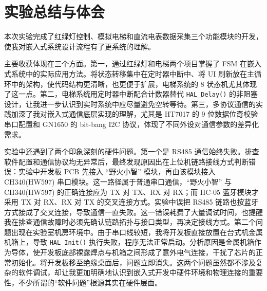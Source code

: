 \documentclass[a4paper,12pt,fontset=windows]{ctexart}
\begin{document}
\section{实验总结与体会}

本次实验完成了红绿灯控制、模拟电梯和直流电表数据采集三个功能模块的开发，使我对嵌入式系统设计流程有了更系统的理解。

主要收获体现在三个方面。第一，通过红绿灯和电梯两个项目掌握了 FSM 在嵌入式系统中的实际应用方法。将状态转移集中在定时器中断中、将 UI 刷新放在主循环中的架构，使代码结构更清晰，也更便于扩展，电梯系统的 8 状态机尤其体现了这一点。第二，电梯系统用定时器中断配合计数器替代 \texttt{HAL\_Delay()} 的非阻塞设计，让我进一步认识到实时系统中应尽量避免空转等待。第三，多协议通信的实践加深了我对嵌入式通信底层实现的理解，尤其是 HT7017 的 9 位数据位奇校验串口配置和 GN1650 的 bit-bang I2C 协议，体现了不同外设对通信参数的差异化需求。

\begin{sloppypar}
实验中还遇到了两个印象深刻的硬件问题。第一个是 RS485 通信始终失败。排查软件配置和通信协议均无异常后，最终发现原因出在上位机链路接线方式判断错误：实验中开发板 PCB 先接入 ``野火小智'' 模块，再由该模块接入 CH340(HW597) 串口模块。这一路径属于普通串口通信，``野火小智'' 与 CH340(HW597) 的正确连接应为 TX 对 TX、RX 对 RX；而 HC-05 蓝牙模块才采用 TX 对 RX、RX 对 TX 的交叉连接方式。实验中误把 RS485 链路也按蓝牙方式接成了交叉连接，导致通信一直失败。这一错误耗费了大量调试时间，也提醒我在排查通信故障时必须先确认链路拓扑与接口类型，再决定接线方式。第二个问题出现在实验室机房环境中。由于串口线较短，我将开发板直接放置在台式机金属机箱上，导致 \texttt{HAL\_Init()} 执行失败，程序无法正常启动。分析原因是金属机箱作为导体，使开发板底部裸露焊点与机箱之间形成了意外电气连接，干扰了芯片的正常初始化。将开发板移至绝缘桌面后，问题立即消失。这两个问题虽然都不涉及复杂的软件调试，却让我更加明确地认识到嵌入式开发中硬件环境和物理连接的重要性，不少所谓的``软件问题''根源其实在硬件层面。
\end{sloppypar}
\end{document}
